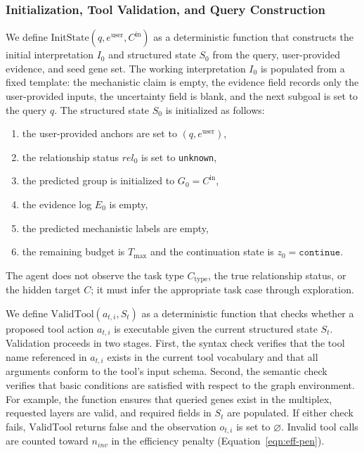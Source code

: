\documentclass[thesis,letterpaper,12pt]{utthesis}
\begin{document}
\subsubsection{Initialization, Tool Validation, and Query Construction}\label{sec:init-valid-query}

We define $\text{InitState}(q, e^{\text{user}}, C^{\text{in}})$ as a deterministic function that constructs the initial interpretation $I_0$ and structured state $S_0$ from the query, user-provided evidence, and seed gene set. The working interpretation $I_0$ is populated from a fixed template: the mechanistic claim is empty, the evidence field records only the user-provided inputs, the uncertainty field is blank, and the next subgoal is set to the query $q$. The structured state $S_0$ is initialized as follows:
\begin{enumerate}
    \item the user-provided anchors are set to $(q, e^{\text{user}})$,
    \item the relationship status $rel_0$ is set to \texttt{unknown},
    \item the predicted group is initialized to $G_0 = C^{\text{in}}$,
    \item the evidence log $E_0$ is empty,
    \item the predicted mechanistic labels are empty,
    \item the remaining budget is $T_{\max}$ and the continuation state is $z_0 = \texttt{continue}$.
\end{enumerate}
The agent does not observe the task type $C_{\text{type}}$, the true relationship status, or the hidden target $C$; it must infer the appropriate task case through exploration.

We define $\text{ValidTool}(a_{t,i}, S_t)$ as a deterministic function that checks whether a proposed tool action $a_{t,i}$ is executable given the current structured state $S_t$. Validation proceeds in two stages. First, the syntax check verifies that the tool name referenced in $a_{t,i}$ exists in the current tool vocabulary and that all arguments conform to the tool's input schema. Second, the semantic check verifies that basic conditions are satisfied with respect to the graph environment. For example, the function ensures that queried genes exist in the multiplex, requested layers are valid, and required fields in $S_t$ are populated. If either check fails, $\text{ValidTool}$ returns false and the observation $o_{t,i}$ is set to $\varnothing$. Invalid tool calls are counted toward $n_{inv}$ in the efficiency penalty (Equation~\ref{eqn:eff-pen}).
\end{document}
